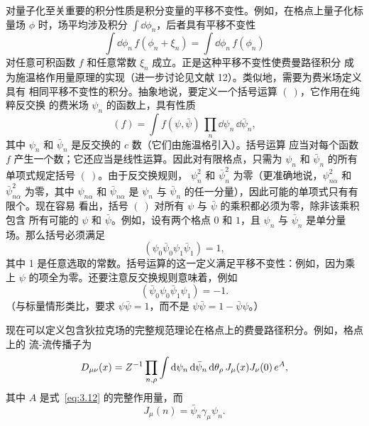 对量子化至关重要的积分性质是积分变量的平移不变性。例如，在格点上量子化标量场
$\phi$ 时，场平均涉及积分 $\int\dd\phi_{n}$，后者具有平移不变性
\begin{equation}
\int\dd\phi_{n}\,f(\phi_{n}+\xi_{n}) = \int\dd\phi_{n}\,f(\phi_{n})
\label{eq:3.30}
\end{equation}
对任意可积函数 $f$ 和任意常数 $\xi_{n}$ 成立。正是这种平移不变性使费曼路径积分
成为施温格作用量原理的实现（进一步讨论见文献 12）。类似地，需要为费米场定义具有
相同平移不变性的积分。抽象地说，要定义一个括号运算 $(\ )$，它作用在纯粹反交换
的费米场 $\psi_{n}$ 的函数上，具有性质
\begin{equation}
(f) = \int f(\psi,\bar\psi)\,\prod_{n}\dd\psi_{n}\,\dd\bar\psi_{n},
\label{eq:3.31}
\end{equation}
其中 $\psi_{n}$ 和 $\bar\psi_{n}$ 是反交换的 $c$ 数（它们由施温格引入）。括号运算
应当对每个函数 $f$ 产生一个数；它还应当是线性运算。因此对有限格点，只需为
$\psi_{n}$ 和 $\bar\psi_{n}$ 的所有单项式规定括号 $(\ )$。由于反交换规则，
$\psi_{n}^{2}$ 和 $\bar\psi_{n}^{2}$ 为零（更准确地说，$\psi_{n\alpha}^{2}$ 和
$\bar\psi_{n\alpha}^{2}$ 为零，其中 $\psi_{n\alpha}$ 和 $\bar\psi_{n\alpha}$ 是
$\psi_{n}$ 与 $\bar\psi_{n}$ 的任一分量），因此可能的单项式只有有限个。现在容易
看出，括号 $(\ )$ 对所有 $\psi$ 与 $\bar\psi$ 的乘积都必须为零，除非该乘积包含
所有可能的 $\psi$ 和 $\bar\psi$。例如，设有两个格点 $0$ 和 $1$，且 $\psi_{n}$ 与
$\bar\psi_{n}$ 是单分量场。那么括号必须满足
\begin{equation}
(\psi_{0}\bar\psi_{0}\psi_{1}\bar\psi_{1}) = 1,
\label{eq:3.32}
\end{equation}
其中 1 是任意选取的常数。括号运算的这一定义满足平移不变性：例如，因为乘上
$\psi$ 的项全为零。还要注意反交换规则意味着，例如
\begin{equation}
(\bar\psi_{0}\psi_{0}\bar\psi_{1}\psi_{1}) = -1.
\label{eq:3.33}
\end{equation}
（与标量情形类比，要求 $\psi\bar\psi = 1$，而不是 $\psi\bar\psi = 1 - \bar\psi\psi$。）

现在可以定义包含狄拉克场的完整规范理论在格点上的费曼路径积分。例如，格点上的
流-流传播子为
\begin{equation}
D_{\mu\nu}(x) = Z^{-1}\prod_{n,\rho}\int\mathrm{d}\psi_{n}\,\mathrm{d}\bar\psi_{n}\,
  \mathrm{d}\theta_{\rho}\,J_{\mu}(x)J_{\nu}(0)\,e^{A},
\label{eq:3.34}
\end{equation}
其中 $A$ 是式~\eqref{eq:3.12} 的完整作用量，而
\begin{equation}
J_{\mu}(n) = \bar\psi_{n}\gamma_{\mu}\psi_{n}.
\label{eq:3.35}
\end{equation}

